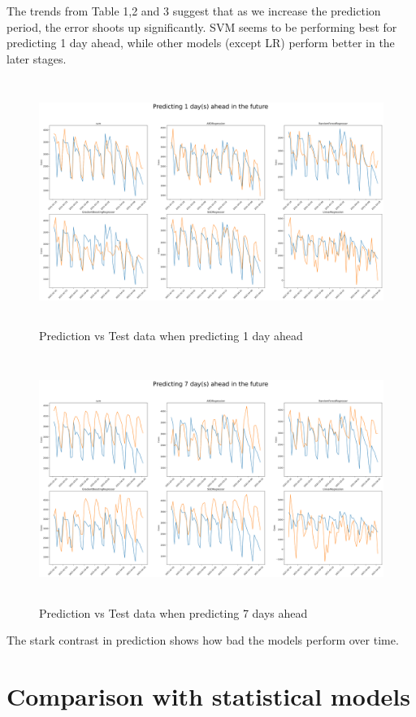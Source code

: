 \documentclass[12pt,a4paper]{article}
\begin{document}
The trends from Table 1,2 and 3 suggest that as we increase the prediction period, 
the error shoots up significantly. SVM seems to be performing best for predicting 
1 day ahead, while other models (except LR) perform better in the later stages.
\newpage
\begin{figure}[H]
    \centering
    \includegraphics[width=1\textwidth,height=80mm]{images/1_day.png}
    \caption{Prediction vs Test data when predicting 1 day ahead}
\end{figure}

\begin{figure}[H]
    \centering
    \includegraphics[width=1\textwidth,height=80mm]{images/7_day.png}
    \caption{Prediction vs Test data when predicting 7 days ahead}
\end{figure}
The stark contrast in prediction shows how bad the models perform over time. 
\section*{Comparison with statistical models}
\end{document}
